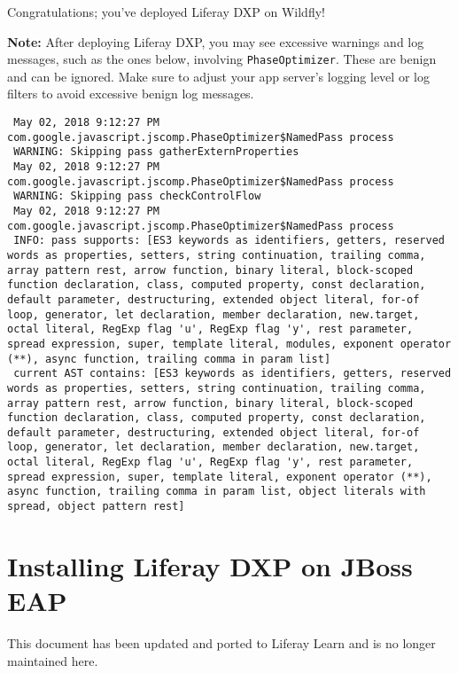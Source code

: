 Congratulations; you've deployed Liferay DXP on Wildfly!

\noindent\hrulefill

\textbf{Note:} After deploying Liferay DXP, you may see excessive
warnings and log messages, such as the ones below, involving
\texttt{PhaseOptimizer}. These are benign and can be ignored. Make sure
to adjust your app server's logging level or log filters to avoid
excessive benign log messages.

\begin{verbatim}
 May 02, 2018 9:12:27 PM com.google.javascript.jscomp.PhaseOptimizer$NamedPass process
 WARNING: Skipping pass gatherExternProperties
 May 02, 2018 9:12:27 PM com.google.javascript.jscomp.PhaseOptimizer$NamedPass process
 WARNING: Skipping pass checkControlFlow
 May 02, 2018 9:12:27 PM com.google.javascript.jscomp.PhaseOptimizer$NamedPass process
 INFO: pass supports: [ES3 keywords as identifiers, getters, reserved words as properties, setters, string continuation, trailing comma, array pattern rest, arrow function, binary literal, block-scoped function declaration, class, computed property, const declaration, default parameter, destructuring, extended object literal, for-of loop, generator, let declaration, member declaration, new.target, octal literal, RegExp flag 'u', RegExp flag 'y', rest parameter, spread expression, super, template literal, modules, exponent operator (**), async function, trailing comma in param list]
 current AST contains: [ES3 keywords as identifiers, getters, reserved words as properties, setters, string continuation, trailing comma, array pattern rest, arrow function, binary literal, block-scoped function declaration, class, computed property, const declaration, default parameter, destructuring, extended object literal, for-of loop, generator, let declaration, member declaration, new.target, octal literal, RegExp flag 'u', RegExp flag 'y', rest parameter, spread expression, super, template literal, exponent operator (**), async function, trailing comma in param list, object literals with spread, object pattern rest]
\end{verbatim}

\chapter{Installing Liferay DXP on JBoss
EAP}\label{installing-liferay-dxp-on-jboss-eap}

{This document has been updated and ported to Liferay Learn and is no
longer maintained here.}

